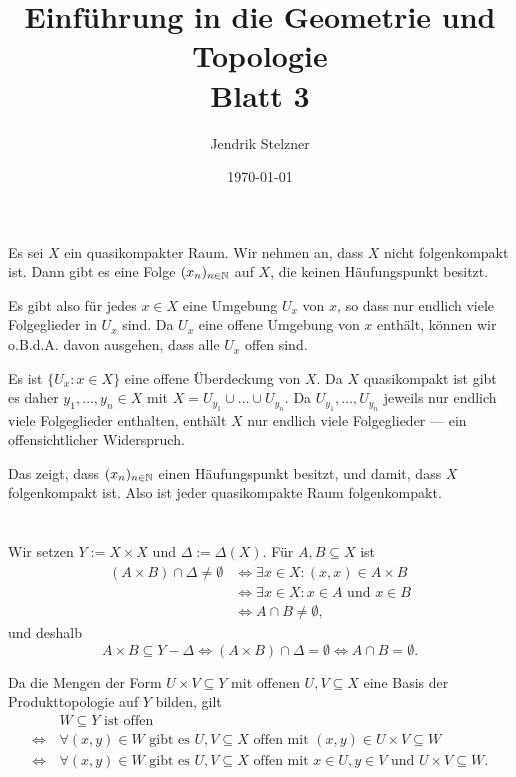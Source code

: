 \documentclass[a4paper,10pt]{article}
\title{\sc Einführung in die Geometrie und Topologie \\ \Large Blatt 3}
\author{Jendrik Stelzner}
\date{\today}
\begin{document}
\maketitle





\section{}
Es sei $X$ ein quasikompakter Raum. Wir nehmen an, dass $X$ nicht folgenkompakt ist. Dann gibt es eine Folge $(x_n)_{n \in \mathbb{N}}$ auf $X$, die keinen Häufungspunkt besitzt.

Es gibt also für jedes $x \in X$ eine Umgebung $U_x$ von $x$, so dass nur endlich viele Folgeglieder in $U_x$ sind. Da $U_x$ eine offene Umgebung von $x$ enthält, können wir o.B.d.A. davon ausgehen, dass alle $U_x$ offen sind.

Es ist $\{U_x : x \in X\}$ eine offene Überdeckung von $X$. Da $X$ quasikompakt ist gibt es daher $y_1, \ldots, y_n \in X$ mit $X = U_{y_1} \cup \ldots \cup U_{y_n}$. Da $U_{y_1}, \ldots, U_{y_n}$ jeweils nur endlich viele Folgeglieder enthalten, enthält $X$ nur endlich viele Folgeglieder — ein offensichtlicher Widerspruch.

Das zeigt, dass $(x_n)_{n \in \mathbb{N}}$ einen Häufungspunkt besitzt, und damit, dass $X$ folgenkompakt ist. Also ist jeder quasikompakte Raum folgenkompakt.





\section{}
Wir setzen $Y := X \times X$ und $\Delta := \Delta(X)$. Für $A,B \subseteq X$ ist
\begin{align*}
                  (A \times B) \cap \Delta \neq \emptyset
 &\Leftrightarrow \exists x \in X : (x,x) \in A \times B \\
 &\Leftrightarrow \exists x \in X : x \in A \text{ und } x \in B \\
 &\Leftrightarrow A \cap B \neq \emptyset,
\end{align*}
und deshalb
\[
 A \times B \subseteq Y-\Delta
 \Leftrightarrow (A \times B) \cap \Delta = \emptyset
 \Leftrightarrow A \cap B = \emptyset.
\]

Da die Mengen der Form $U \times V \subseteq Y$ mit offenen $U, V \subseteq X$ eine Basis der Produkttopologie auf $Y$ bilden, gilt
\begin{align*}
                &\, W \subseteq Y \text{ ist offen} \\
 \Leftrightarrow&\, \forall (x,y) \in W \text{ gibt es } U,V \subseteq X \text{ offen mit } (x,y) \in U \times V \subseteq W \\
 \Leftrightarrow&\, \forall (x,y) \in W \text{ gibt es } U,V \subseteq X \text{ offen mit } x \in U, y \in V \text{ und } U \times V \subseteq W.
\end{align*}
\end{document}

